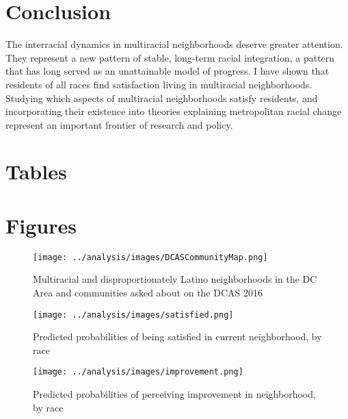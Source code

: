 \documentclass{baderart}
\begin{document}
\section{Conclusion}
The interracial dynamics in multiracial neighborhoods deserve greater attention. They represent a new pattern of stable, long-term racial integration, a pattern that has long served as an unattainable model of progress. I have shown that residents of all races find satisfaction living in multiracial neighborhoods. Studying which aspects of multiracial neighborhoods satisfy residents, and incorporating their existence into theories explaining metropolitan racial change represent an important frontier of research and policy.  


\clearpage
\singlespace
\singlespace
 	
	


\clearpage 

\section{Tables}
















\clearpage
\section{Figures}

\begin{figure}[h!]
\caption{Multiracial and disproportionately Latino neighborhoods in the DC Area and communities asked about on the DCAS 2016}
\label{fig:map}
\centering
\texttt{[image: ../analysis/images/DCASCommunityMap.png]}
\end{figure}

\begin{sidewaysfigure}
\caption{Predicted probabilities of being satisfied in current neighborhood, by race}
\label{fig:satisfaction}
\centering
\texttt{[image: ../analysis/images/satisfied.png]}
\end{sidewaysfigure}

\begin{sidewaysfigure}
\caption{Predicted probabilities of perceiving improvement in neighborhood, by race}
\label{fig:improvement}
\centering
\texttt{[image: ../analysis/images/improvement.png]}
\end{sidewaysfigure}
\end{document}
